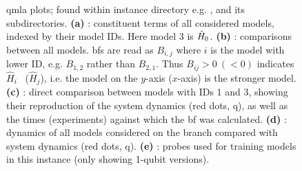\begin{figure}[H]
\begin{center}
{            \label{fig:qmla_bayes_factor_comparison}
        }
        \qquad
        \qquad
    \end{center}
    \caption[Instance plots]{
        \gls{qmla} plots; found within instance directory e.g. , 
        and its subdirectories. 
        \textbf{(a)} : constituent terms of all considered models, indexed by their model IDs.
        Here model 3 is $\hat{H}_0$. 
        \textbf{(b)} :  comparisons between all models. 
        \glspl{bf} are read as $B_{i,j}$ where $i$ is the model with lower ID, 
            e.g. $B_{1,2}$ rather than $B_{2,1}$. 
            Thus $B_{ij} > 0 \ (<0)$ indicates $\hat{H}_i$ \ ($\hat{H}_j$), i.e. the model on the $y$-axis ($x$-axis) 
            is the stronger model.
        \textbf{(c)} : direct comparison between models with IDs 1 and 3, 
            showing their reproduction of the system dynamics (red dots, \gls{q}), 
            as well as the times (experiments) against which the \gls{bf} was calculated. 
        \textbf{(d)} : dynamics of all models considered on the branch
        compared with system dynamics (red dots, \gls{q}). 
        \textbf{(e)} : probes used for training models in this \gls{instance} (only showing 1-qubit versions).
    }
    \label{fig:instance_plots}
\end{figure}


